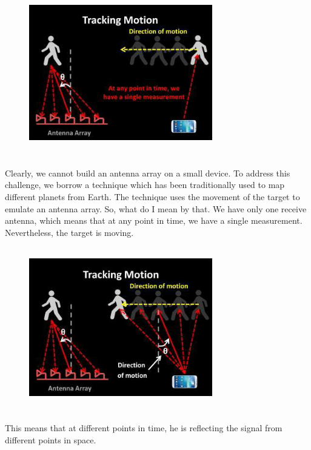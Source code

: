 \documentclass[a4paper,12pt,oneside]{article}
\begin{document}
\begin{figure}[H]
\centering
\includegraphics[height=7cm,width=8cm]{11.png}
\end{figure}

\paragraph{}
Clearly, we cannot build an antenna array on a small device. To address this challenge,
we borrow a technique which has been traditionally used to map different planets from Earth.
The technique uses the movement of the target to emulate an antenna array. So, what do I mean
by that. We have only one receive antenna, which means that at any point in time, we have a
single measurement. Nevertheless, the target is moving.

\begin{figure}[H]
\centering
\includegraphics[height=7cm,width=8cm]{12.png}
\end{figure}

\paragraph{}
This means that at different points in time, he is reflecting the signal from different points
in space.
\end{document}
